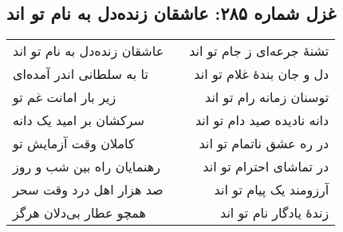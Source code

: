 \begin{center}
\section*{غزل شماره ۲۸۵: عاشقان زنده‌دل به نام تو اند}
\label{sec:285}
\begin{longtable}{l p{0.5cm} r}
عاشقان زنده‌دل به نام تو اند
&&
تشنهٔ جرعه‌ای ز جام تو اند
\\
تا به سلطانی اندر آمده‌ای
&&
دل و جان بندهٔ غلام تو اند
\\
زیر بار امانت غم تو
&&
توسنان زمانه رام تو اند
\\
سرکشان بر امید یک دانه
&&
دانه نادیده صید دام تو اند
\\
کاملان وقت آزمایش تو
&&
در ره عشق ناتمام تو اند
\\
رهنمایان راه بین شب و روز
&&
در تماشای احترام تو اند
\\
صد هزار اهل درد وقت سحر
&&
آرزومند یک پیام تو اند
\\
همچو عطار بی‌دلان هرگز
&&
زندهٔ یادگار نام تو اند
\\
\end{longtable}
\end{center}
